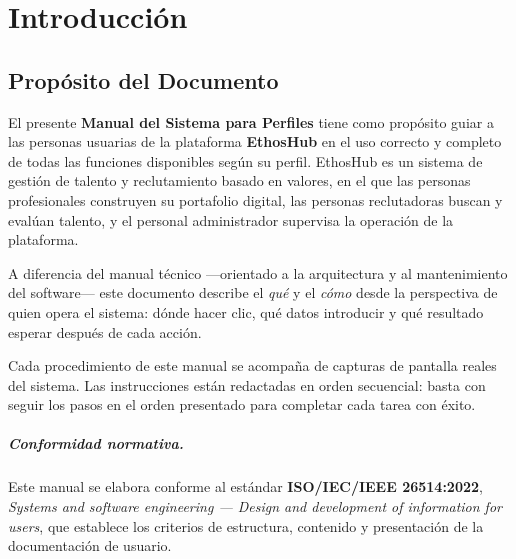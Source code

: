 \chapter{Introducción}
\label{ch:introduccion}

\section{Propósito del Documento}
\label{sec:proposito}

El presente \textbf{Manual del Sistema para Perfiles} tiene como propósito guiar a las
personas usuarias de la plataforma \textbf{EthosHub} en el uso correcto y completo de
todas las funciones disponibles según su perfil. EthosHub es un sistema de gestión de
talento y reclutamiento basado en valores, en el que las personas profesionales
construyen su portafolio digital, las personas reclutadoras buscan y evalúan talento, y
el personal administrador supervisa la operación de la plataforma.

A diferencia del manual técnico —orientado a la arquitectura y al mantenimiento del
software— este documento describe el \textit{qué} y el \textit{cómo} desde la
perspectiva de quien opera el sistema: dónde hacer clic, qué datos introducir y qué
resultado esperar después de cada acción.

\begin{AvisoNota}
Cada procedimiento de este manual se acompaña de capturas de pantalla reales del
sistema. Las instrucciones están redactadas en orden secuencial: basta con seguir los
pasos en el orden presentado para completar cada tarea con éxito.
\end{AvisoNota}

\paragraph{Conformidad normativa.} Este manual se elabora conforme al estándar
\textbf{ISO/IEC/IEEE 26514:2022}, \textit{Systems and software engineering --- Design
and development of information for users}, que establece los criterios de estructura,
contenido y presentación de la documentación de usuario.

